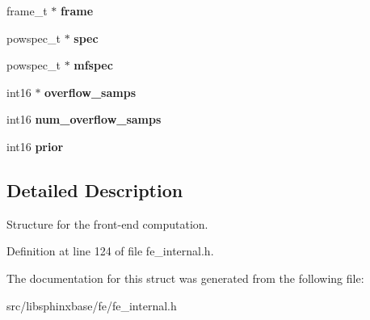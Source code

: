 \begin{DoxyCompactItemize}
\item 
frame\-\_\-t $\ast$ {\bfseries frame}\label{structfe__s_a6fe89784eb5d23ee812439f427d33fe6}

\item 
powspec\-\_\-t $\ast$ {\bfseries spec}\label{structfe__s_af455b0ee3f8d81ca84ac88d4ea04e860}

\item 
powspec\-\_\-t $\ast$ {\bfseries mfspec}\label{structfe__s_a87fd448109884fc3d796b926b67697e7}

\item 
int16 $\ast$ {\bfseries overflow\-\_\-samps}\label{structfe__s_a7975216c6a540fa498352736404797b1}

\item 
int16 {\bfseries num\-\_\-overflow\-\_\-samps}\label{structfe__s_ac22fe7c117ef00eb513d7d0771333ddd}

\item 
int16 {\bfseries prior}\label{structfe__s_ae6af635a19dac6426bf882a3fc5b069b}

\end{DoxyCompactItemize}


\subsection{\-Detailed \-Description}
\-Structure for the front-\/end computation. 



\-Definition at line 124 of file fe\-\_\-internal.\-h.



\-The documentation for this struct was generated from the following file\-:\begin{DoxyCompactItemize}
\item 
src/libsphinxbase/fe/fe\-\_\-internal.\-h\end{DoxyCompactItemize}
